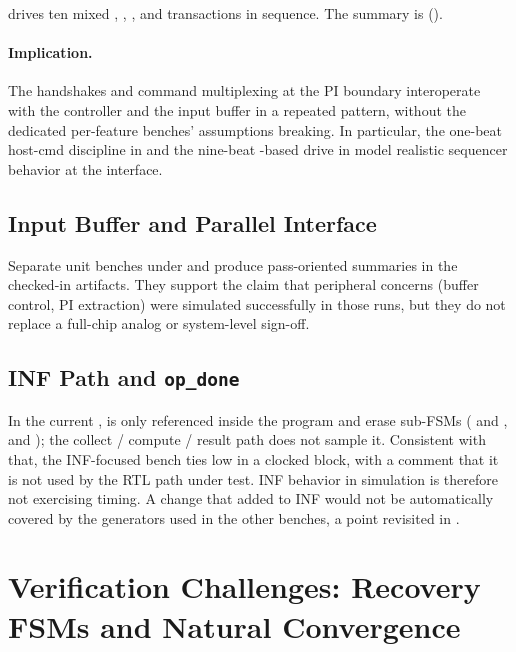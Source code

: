  drives ten
mixed , , , and
 transactions in sequence. The summary is
 ().

\paragraph{Implication.}
The handshakes and command multiplexing at the PI boundary interoperate
with the controller and the input buffer in a repeated pattern, without
the dedicated per-feature benches' assumptions breaking. In particular,
the one-beat host-cmd discipline in  and the nine-beat
-based drive in  model realistic
sequencer behavior at the interface.

\subsection{Input Buffer and Parallel Interface}
\label{sec:analysis-unit}

Separate unit benches under  and
 produce pass-oriented summaries in the
checked-in artifacts. They support the claim that peripheral concerns
(buffer control, PI extraction) were simulated successfully in those
runs, but they do not replace a full-chip analog or system-level
sign-off.

\subsection{INF Path and \texttt{op\_done}}
\label{sec:analysis-inf-opdone}

In the current ,  is only
referenced inside the program and erase sub-FSMs (
and ,  and
); the collect / compute / result path does not
sample it. Consistent with that, the INF-focused bench
 ties  low in
a clocked block, with a comment that it is not used by the RTL path
under test. INF behavior in simulation is therefore not exercising
 timing. A change that added  to
INF would not be automatically covered by the 
generators used in the other benches, a point revisited in
.

\section{Verification Challenges: Recovery FSMs and Natural Convergence}
\label{sec:analysis-challenges}

